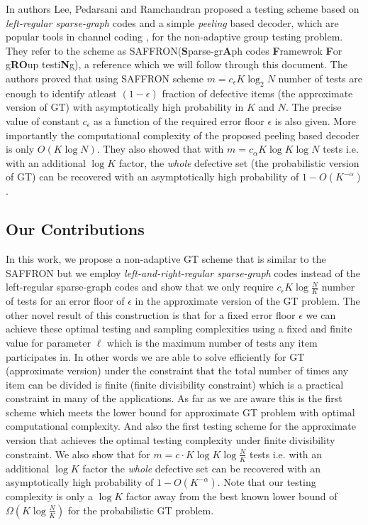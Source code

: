 \documentclass[conference,twocolumn]{IEEEtran}
\begin{document}
In \cite{lee2015saffron} authors Lee, Pedarsani and Ramchandran proposed a testing scheme based on \textit{left-regular sparse-graph} codes and a simple \textit{peeling} based decoder, which are popular tools in channel coding \cite{richardson2008modern}, for the non-adaptive group testing problem. They refer to the scheme as SAFFRON(\textbf{S}parse-gr\textbf{A}ph codes \textbf{F}ramewrok \textbf{F}or g\textbf{RO}up testi\textbf{N}g), a reference which we will follow through this document. The authors proved that using SAFFRON scheme $m=c_\epsilon K\log_2 N$ number of tests are enough to identify atleast $(1-\epsilon)$ fraction of defective items (the approximate version of GT) with asymptotically high probability in $K$ and $N$. The precise value of constant $c_\epsilon$ as a function of the required error floor $\epsilon$ is also given. More importantly the computational complexity of the proposed peeling based decoder is only $O(K\log N)$. They also showed that with $m=c_\alpha K\log K \log N$ tests  i.e. with an additional $\log K$ factor, the \textit{whole} defective set (the probabilistic version of GT) can be recovered with an asymptotically high probability of $1-O(K^{-\alpha})$.

\subsection*{Our Contributions}
In this work, we propose a non-adaptive GT scheme that is similar to the SAFFRON but we employ \textit{left-and-right-regular sparse-graph} codes instead of the left-regular sparse-graph codes and show that we only require $c_\epsilon K\log \frac{N}{K}$ number of tests for an error floor of $\epsilon$ in the approximate version of the GT problem. The other novel result of this construction is that for a fixed error floor $\epsilon$ we can achieve these optimal testing and sampling complexities using a fixed and finite value for parameter $\ell$ which is the maximum number of tests any item participates in. In other words we are able to solve efficiently for GT (approximate version) under the constraint that the total number of times any item can be divided is finite (finite divisibility constraint)\cite{gandikotanearly} which is a practical constraint in many of the applications. As far as we are aware this is the first scheme which meets the lower bound for approximate GT problem with optimal computational complexity. And also the first testing scheme for the approximate version that achieves the optimal testing complexity under finite divisibility constraint. We also show that for $m=c\cdot K\log K \log \frac{N}{K}$ tests  i.e. with an additional $\log K$ factor the \textit{whole} defective set can be recovered with an asymptotically high probability of $1-O(K^{-\alpha})$. Note that our testing complexity is only a $\log K$ factor away from the best known lower bound of $\Omega(K\log \frac{N}{K})$ \cite{chan2014non} for the probabilistic GT problem.
\end{document}
